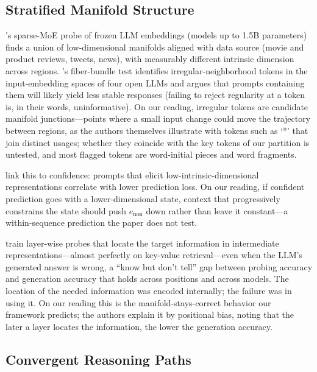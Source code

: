 \subsection{Stratified Manifold Structure}

\citet{li2025unraveling}'s sparse-MoE probe of frozen LLM embeddings (models up to 1.5B parameters) finds a union of low-dimensional manifolds aligned with data source (movie and product reviews, tweets, news), with measurably different intrinsic dimension across regions. \citet{robinson2025token}'s fiber-bundle test identifies irregular-neighborhood tokens in the input-embedding spaces of four open LLMs and argues that prompts containing them will likely yield less stable responses (failing to reject regularity at a token is, in their words, uninformative). On our reading, irregular tokens are candidate manifold junctions---points where a small input change could move the trajectory between regions, as the authors themselves illustrate with tokens such as `*' that join distinct usages; whether they coincide with the key tokens of our partition is untested, and most flagged tokens are word-initial pieces and word fragments.

\citet{viswanathan2024geometry} link this to confidence: prompts that elicit low-intrinsic-dimensional representations correlate with lower prediction loss. On our reading, if confident prediction goes with a lower-dimensional state, context that progressively constrains the state should push $e_{\text{non}}$ down rather than leave it constant---a within-sequence prediction the paper does not test.

\citet{gao2024insights} train layer-wise probes that locate the target information in intermediate representations---almost perfectly on key-value retrieval---even when the LLM's generated answer is wrong, a ``know but don't tell'' gap between probing accuracy and generation accuracy that holds across positions and across models. The location of the needed information was encoded internally; the failure was in using it. On our reading this is the manifold-stays-correct behavior our framework predicts; the authors explain it by positional bias, noting that the later a layer locates the information, the lower the generation accuracy.

\subsection{Convergent Reasoning Paths}


